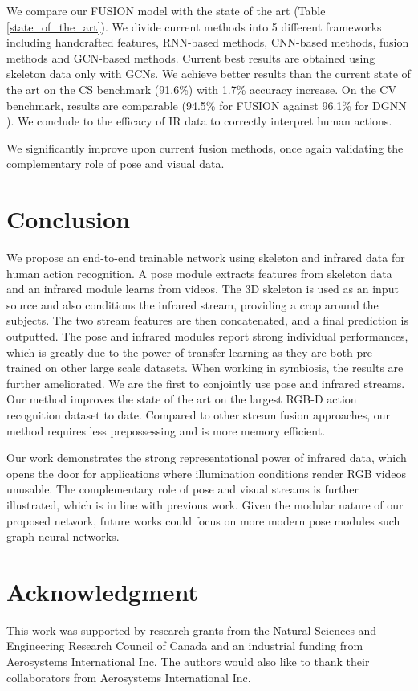 \documentclass[letterpaper, 10 pt, conference]{ieeeconf}
\begin{document}
We compare our FUSION model with the state of the art (Table \ref{state_of_the_art}). We divide current methods into 5 different frameworks including handcrafted features, RNN-based methods, CNN-based methods, fusion methods and GCN-based methods. Current best results are obtained using skeleton data only with GCNs. We achieve better results than the current state of the art on the CS benchmark (91.6\%) with 1.7\% accuracy increase. On the CV benchmark, results are comparable (94.5\% for FUSION against 96.1\% for DGNN \cite{shi2019skeleton}). We conclude to the efficacy of IR data to correctly interpret human actions. 

We significantly improve upon current fusion methods, once again validating the complementary role of pose and visual data. 

\section{Conclusion}

We propose an end-to-end trainable network using skeleton and infrared data for human action recognition. A pose module extracts features from skeleton data and an infrared module learns from videos. The 3D skeleton is used as an input source and also conditions the infrared stream, providing a crop around the subjects. The two stream features are then concatenated, and a final prediction is outputted. The pose and infrared modules report strong individual performances, which is greatly due to the power of transfer learning as they are both pre-trained on other large scale datasets. When working in symbiosis, the results are further ameliorated. We are the first to conjointly use pose and infrared streams. Our method improves the state of the art on the largest RGB-D action recognition dataset to date. Compared to other stream fusion approaches, our method requires less prepossessing and is more memory efficient. 

Our work demonstrates the strong representational power of infrared data, which opens the door for applications where illumination conditions render RGB videos unusable. The complementary role of pose and visual streams is further illustrated, which is in line with previous work. Given the modular nature of our proposed network, future works could focus on more modern pose modules such graph neural networks.


\section*{Acknowledgment}

This work was supported by research grants from the Natural Sciences and Engineering Research Council of Canada and an industrial funding from Aerosystems International Inc. The authors would also like to thank their collaborators from Aerosystems International Inc.















\end{document}
